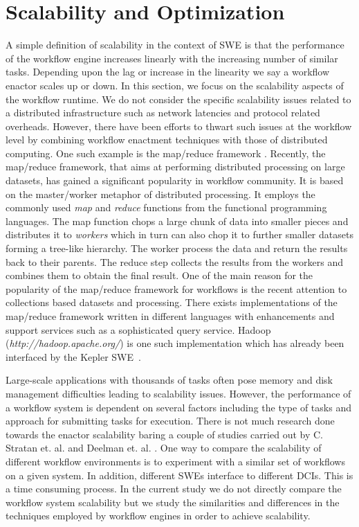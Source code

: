 \section{Scalability and Optimization} \label{sec:scal}
A simple definition of scalability in the context of SWE is that the
performance of the workflow engine increases linearly with the increasing
number of similar tasks. Depending upon the lag or increase in the linearity we
say a workflow enactor scales up or down.  In this section, we focus on
the scalability aspects of the workflow runtime. We do not consider the
specific scalability issues related to a distributed infrastructure such as
network latencies and protocol related overheads. However, there have been efforts to
thwart such issues at the workflow level by combining workflow enactment
techniques with those of distributed computing.  One such example is the
map/reduce framework \cite{mapreduce}.  Recently, the map/reduce framework,
that aims at performing distributed processing on large datasets, has gained a
significant popularity in workflow community. It is based on the master/worker
metaphor of distributed processing.  It employs the commonly used \textit{map}
and \textit{reduce} functions from the functional programming languages. The
map function chops a large chunk of data into smaller pieces and distributes it
to \textit{workers} which in turn can also chop it to further smaller datasets
forming a tree-like hierarchy. The worker process the data and return the
results back to their parents. The reduce step collects the results from the
workers and combines them to obtain the final result. One of the main reason
for the popularity of the map/reduce framework for workflows is the recent
attention to collections based datasets and processing. There exists
implementations of the map/reduce framework written in different languages with
enhancements and support services such as a sophisticated query service. Hadoop
(\textit{http://hadoop.apache.org/}) is one such implementation which has
already been interfaced by the Kepler SWE~\cite{wang-crawl-etal:2009}.

Large-scale applications with thousands of tasks often pose memory and disk
management difficulties leading to scalability issues.  However, the
performance of a workflow system is dependent on several factors including the
type of tasks and approach for submitting tasks for execution.  There is not
much research done towards the enactor scalability baring a couple of studies
carried out by C. Stratan et. al. \cite{stratan-iosup-etal:2008} and Deelman
et. al. \cite{callaghan-deelman-etal:2010}.  One way to compare the scalability
of different workflow environments is to experiment with a similar set of
workflows on a given system. In addition, different SWEs interface to different
DCIs. This is a time consuming process.  In the current study we do not
directly compare the workflow system scalability but we study the similarities
and differences in the techniques employed by workflow engines in order to
achieve scalability.

